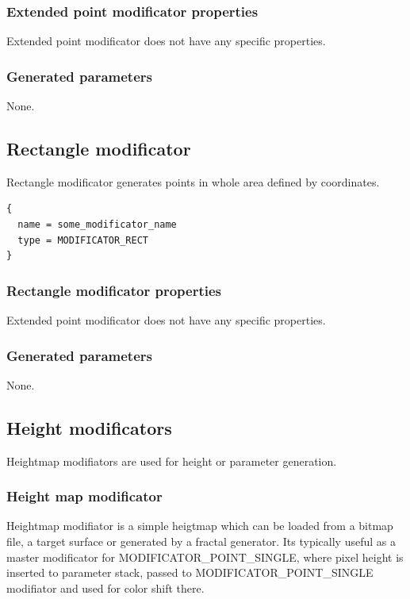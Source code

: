 \documentclass[9pt]{article}
\begin{document}
\subsubsection*{Extended point modificator properties}
Extended point modificator does not have any specific properties.
\subsubsection*{Generated parameters}

None.

\subsection{Rectangle modificator}

Rectangle modificator generates points in whole area defined by coordinates.
\begin{verbatim}
{
  name = some_modificator_name
  type = MODIFICATOR_RECT
}
\end{verbatim}
\subsubsection*{Rectangle modificator properties}
Extended point modificator does not have any specific properties.
\subsubsection*{Generated parameters}

None.

\subsection{Height modificators}

Heightmap modifiators are used for height or parameter generation.

\subsubsection{Height map modificator}

Heightmap modifiator is a simple heigtmap which can be loaded from a bitmap
file, a target surface or generated by a fractal generator. Its typically useful
as a master modificator for MODIFICATOR\_POINT\_SINGLE, where pixel height
is inserted to parameter stack, passed to MODIFICATOR\_POINT\_SINGLE modifiator
and used for color shift there.
\end{document}
